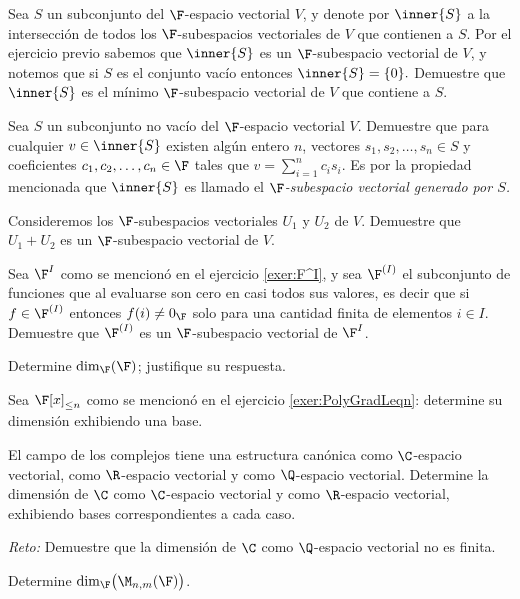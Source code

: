 \begin{exerciselist}
  \item \label{exer:SubEsGene} Sea $S$ un subconjunto del $\F$-espacio vectorial $V$, y denote por $\inner{S}$ a la intersección de todos los $\F$-subespacios vectoriales de $V$ que contienen a $S$. Por el ejercicio previo sabemos que $\inner{S}$ es un $\F$-subespacio vectorial de $V$, y notemos que si $S$ es el conjunto vacío entonces $\inner{S} = \{ 0 \}.$ Demuestre que $\inner{S}$ es el mínimo $\F$-subespacio vectorial de $V$ que contiene a $S$.
  
  \item \label{exer:SubEsCombLin} Sea $S$ un subconjunto no vacío del $\F$-espacio vectorial $V$. Demuestre que para cualquier $v \in \inner{S}$ existen algún entero $n$, vectores $s_1, s_2, \ldots, s_n \in S$ y coeficientes $c_1, c_2, \ldots, c_n \in \F$ tales que $v = \sum _{i=1}^n c_i s_i$. Es por la propiedad mencionada que $\inner{S}$ es llamado el \emph{$\F$-subespacio vectorial generado por $S$.}
  

  \item Consideremos los $\F$-subespacios vectoriales $U_1$ y $U_2$ de $V$. Demuestre que $U_1 + U_2$ es un $\F$-subespacio vectorial de $V$.
  
  \item \label{exer:F^IFinito} Sea $\F^{I}$ como se mencionó en el ejercicio \ref{exer:F^I}, y sea $\F^{(I)}$ el subconjunto de funciones que al evaluarse son cero en casi todos sus valores, es decir que si $f \in \F^{(I)}$ entonces $f(i) \neq 0_\F$ solo para una cantidad finita de elementos $i \in I$. Demuestre que $\F^{(I)}$ es un $\F$-subespacio vectorial de $\F^{I}$.
  
  \item Determine $\dim_\F(\F)$; justifique su respuesta.
  
  \item Sea $\F[x]_{\leq n}$ como se mencionó en el ejercicio \ref{exer:PolyGradLeqn}: determine su dimensión exhibiendo una base.
  
  \item El campo de los complejos tiene una estructura canónica como $\C$-espacio vectorial, como $\R$-espacio vectorial
  y como $\Q$-espacio vectorial. Determine la dimensión de $\C$ como $\C$-espacio vectorial y como $\R$-espacio vectorial, exhibiendo bases correspondientes a cada caso.
  
  \emph{Reto:} Demuestre que la dimensión de $\C$ como $\Q$-espacio vectorial no es finita.
  
  \item Determine $\dim_{\F}\bigl( \M_{n,m}(\F) \bigr)$.
  

\end{exerciselist}
